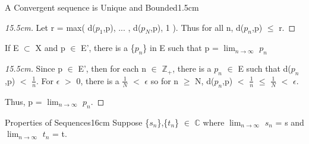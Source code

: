 \begin{ltheorem}{A Convergent sequence is Unique and Bounded}{1.5cm}
\begin{proof}[15.5cm]
                Let r = max( d($p_1$,p), ... , d($p_N$,p), 1 ).
                Thus for all n, d($p_n$,p) $\leq$ r.                
            \end{proof}

        \item If E $\subset$ X and p $\in$ E', there is a \{$p_n$\}
            in E such that p = $\lim_{n \rightarrow \infty}$ $p_n$

            \begin{proof}[15.5cm]
                Since p $\in$ E', then for each n $\in$ $\mathbb{Z}_+$,
                there is a $p_n$ $\in$ E such that d($p_n$,p) $<$ $\frac{1}{n}$.
                For $\epsilon$ $>$ 0, there is a $\frac{1}{N}$ $<$ $\epsilon$
                so for n $\geq$ N,
                d($p_n$,p) $<$ $\frac{1}{n}$ $\leq$ $\frac{1}{N}$ $<$ $\epsilon$.

                Thus, p = $\lim_{n \rightarrow \infty}$ $p_n$.                
            \end{proof}
    \end{ltheorem}

    \vspace{0.5cm}



    \begin{wtheorem}{Properties of Sequences}{16cm}
        Suppose \{$s_n$\},\{$t_n$\} $\in$ $\mathbb{C}$ where
        $\lim_{n \rightarrow \infty}$ $s_n$ = s and
        $\lim_{n \rightarrow \infty}$ $t_n$ = t.
    \end{wtheorem}

